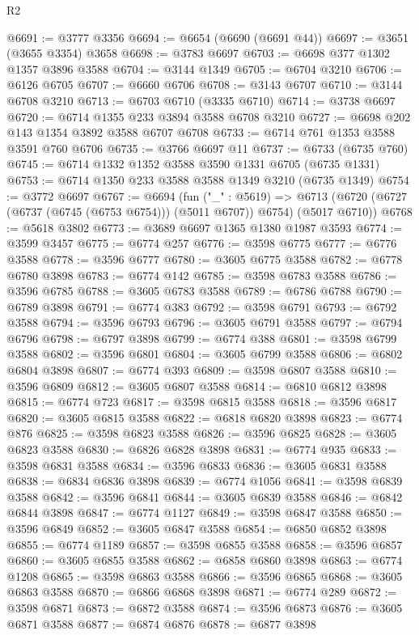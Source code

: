 \begin{lexlean}{R2}
\begin{coremodule}
@6691 := @3777 @3356
@6694 := @6654 (@6690 (@6691 @44))
@6697 := @3651 (@3655 @3354) @3658
@6698 := @3783 @6697
@6703 := @6698 @377 @1302 @1357 @3896 @3588
@6704 := @3144 @1349
@6705 := @6704 @3210
@6706 := @6126 @6705
@6707 := @6660 @6706
@6708 := @3143 @6707
@6710 := @3144 @6708 @3210
@6713 := @6703 @6710 (@3335 @6710)
@6714 := @3738 @6697
@6720 := @6714 @1355 @233 @3894 @3588 @6708 @3210
@6727 := @6698 @202 @143 @1354 @3892 @3588 @6707 @6708
@6733 := @6714 @761 @1353 @3588 @3591 @760 @6706
@6735 := @3766 @6697 @11
@6737 := @6733 (@6735 @760)
@6745 := @6714 @1332 @1352 @3588 @3590 @1331 @6705 (@6735 @1331)
@6753 := @6714 @1350 @233 @3588 @3588 @1349 @3210 (@6735 @1349)
@6754 := @3772 @6697
@6767 := @6694
    (fun ("_" : @5619) =>
    @6713 (@6720 (@6727 (@6737 (@6745 (@6753 @6754))) (@5011 @6707)) @6754) (@5017 @6710))
@6768 := @5618 @3802
@6773 := @3689 @6697 @1365 @1380 @1987 @3593
@6774 := @3599 @3457
@6775 := @6774 @257
@6776 := @3598 @6775
@6777 := @6776 @3588
@6778 := @3596 @6777
@6780 := @3605 @6775 @3588
@6782 := @6778 @6780 @3898
@6783 := @6774 @142
@6785 := @3598 @6783 @3588
@6786 := @3596 @6785
@6788 := @3605 @6783 @3588
@6789 := @6786 @6788
@6790 := @6789 @3898
@6791 := @6774 @383
@6792 := @3598 @6791
@6793 := @6792 @3588
@6794 := @3596 @6793
@6796 := @3605 @6791 @3588
@6797 := @6794 @6796
@6798 := @6797 @3898
@6799 := @6774 @388
@6801 := @3598 @6799 @3588
@6802 := @3596 @6801
@6804 := @3605 @6799 @3588
@6806 := @6802 @6804 @3898
@6807 := @6774 @393
@6809 := @3598 @6807 @3588
@6810 := @3596 @6809
@6812 := @3605 @6807 @3588
@6814 := @6810 @6812 @3898
@6815 := @6774 @723
@6817 := @3598 @6815 @3588
@6818 := @3596 @6817
@6820 := @3605 @6815 @3588
@6822 := @6818 @6820 @3898
@6823 := @6774 @876
@6825 := @3598 @6823 @3588
@6826 := @3596 @6825
@6828 := @3605 @6823 @3588
@6830 := @6826 @6828 @3898
@6831 := @6774 @935
@6833 := @3598 @6831 @3588
@6834 := @3596 @6833
@6836 := @3605 @6831 @3588
@6838 := @6834 @6836 @3898
@6839 := @6774 @1056
@6841 := @3598 @6839 @3588
@6842 := @3596 @6841
@6844 := @3605 @6839 @3588
@6846 := @6842 @6844 @3898
@6847 := @6774 @1127
@6849 := @3598 @6847 @3588
@6850 := @3596 @6849
@6852 := @3605 @6847 @3588
@6854 := @6850 @6852 @3898
@6855 := @6774 @1189
@6857 := @3598 @6855 @3588
@6858 := @3596 @6857
@6860 := @3605 @6855 @3588
@6862 := @6858 @6860 @3898
@6863 := @6774 @1208
@6865 := @3598 @6863 @3588
@6866 := @3596 @6865
@6868 := @3605 @6863 @3588
@6870 := @6866 @6868 @3898
@6871 := @6774 @289
@6872 := @3598 @6871
@6873 := @6872 @3588
@6874 := @3596 @6873
@6876 := @3605 @6871 @3588
@6877 := @6874 @6876
@6878 := @6877 @3898

\end{coremodule}
\end{lexlean}
